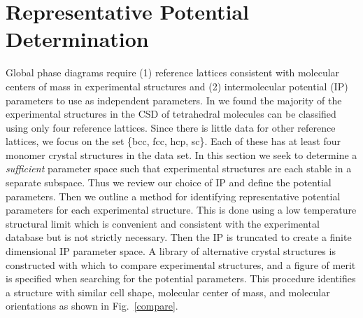 \documentclass[preprint]{revtex4}
\begin{document}

\section{Representative Potential Determination}
\label{method}

Global phase diagrams require (1) reference lattices consistent with
molecular centers of mass in experimental structures and (2)
intermolecular potential (IP) parameters to use as independent
parameters. In \cite{McClurg08} we found the majority of the
experimental structures in the CSD of tetrahedral molecules can be
classified using only four reference lattices. Since there is little
data for other reference lattices, we focus on the set \{bcc, fcc,
hcp, sc\}. Each of these has at least four monomer
crystal structures in the data set. In this section we seek to
determine a \emph{sufficient} parameter space such that experimental
structures are each stable in a separate subspace. Thus we review
our choice of IP and define the potential parameters.  Then we
outline a method for identifying representative potential parameters
for each experimental structure. This is done using a low
temperature structural limit which is convenient and consistent with the experimental database but is not strictly necessary.  Then
the IP is truncated to create a finite dimensional IP parameter
space.  A library of alternative crystal structures is constructed
with which to compare experimental structures, and a figure of merit
is specified when searching for the potential parameters. This
procedure identifies a structure with similar cell shape, molecular
center of mass, and molecular orientations as shown in
Fig.~\ref{compare}.

\end{document}
